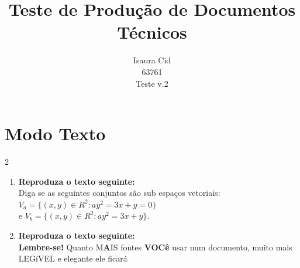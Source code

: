 \documentclass[a4paper,10pt]{report}
\title{Teste de Produção de Documentos Técnicos}
\author{Isaura Cid \\ 63761 \\ Teste v.2}
\begin{document}
\maketitle

\newpage
\chapter{Modo Texto}
\begin{multicols}{2}
\begin{enumerate}
\item \textbf{Reproduza o texto seguinte:} \\
Diga se as seguintes conjuntos são sub espaços vetoriais: \\
$V_a = \{ (x,y) \in R^2 : ay^2 = 3x + y = 0 \}$ \\ 
e $V_b = \{ (x,y) \in R^2 : ay^2 = 3x + y \}$.

\item \textbf{Reproduza o texto seguinte:} \\
\huge\textbf{{Lembre-se}}\Huge\textbf{{!}} \normalsize{Quanto M}\Large\textbf{{A}}\normalsize{IS fontes} \huge\textbf{{VOCê}} \normalsize{usar num documento,  muito mais LEGíVEL e elegante ele fica}\Large{rá}
\end{enumerate}
\end{multicols}
\end{document}
